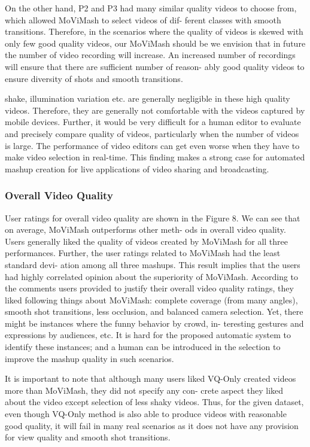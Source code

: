 \documentclass{sig-alternate}
\begin{document}
On the other hand, P2 and P3 had many similar quality videos
to choose from, which allowed MoViMash to select videos of dif-
ferent classes with smooth transitions. Therefore, in the scenarios
where the quality of videos is skewed with only few good quality
videos, our MoViMash should be we envision that in future the
number of video recording will increase. An increased number of
recordings will ensure that there are sufficient number of reason-
ably good quality videos to ensure diversity of shots and smooth
transitions.

shake, illumination variation etc. are generally negligible in these
high quality videos. Therefore, they are generally not comfortable
with the videos captured by mobile devices. Further, it would be
very difficult for a human editor to evaluate and precisely compare
quality of videos, particularly when the number of videos is large.
The performance of video editors can get even worse when they
have to make video selection in real-time. This finding makes a
strong case for automated mashup creation for live applications of
video sharing and broadcasting.

\subsubsection{Overall Video Quality}
User ratings for overall video quality are shown in the Figure 8.
We can see that on average, MoViMash outperforms other meth-
ods in overall video quality. Users generally liked the quality of
videos created by MoViMash for all three performances. Further,
the user ratings related to MoViMash had the least standard devi-
ation among all three mashups. This result implies that the users
had highly correlated opinion about the superiority of MoViMash.
According to the comments users provided to justify their overall
video quality ratings, they liked following things about MoViMash:
complete coverage (from many angles), smooth shot transitions,
less occlusion, and balanced camera selection. Yet, there might
be instances where the funny behavior by crowd, in-
teresting gestures and expressions by audiences, etc. It is hard for
the proposed automatic system to identify these instances; and a
human can be introduced in the selection to improve the mashup
quality in such scenarios.

It is important to note that although many users liked VQ-Only
created videos more than MoViMash, they did not specify any con-
crete aspect they liked about the video except selection of less
shaky videos. Thus, for the given dataset, even though VQ-Only
method is also able to produce videos with reasonable good quality,
it will fail in many real scenarios as it does not have any provision
for view quality and smooth shot transitions.
\end{document}

